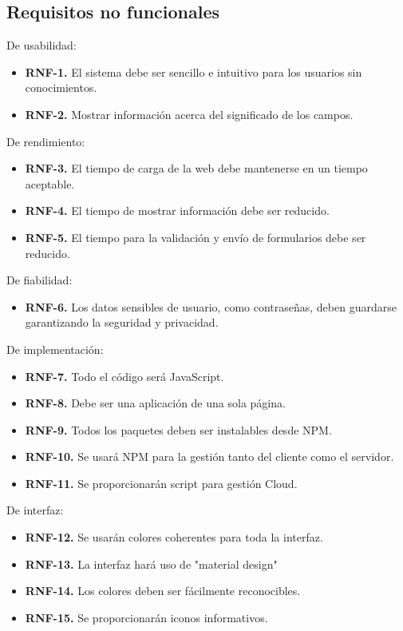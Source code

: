 \subsection{Requisitos no funcionales}

  De usabilidad:
\begin{itemize}
  \item \textbf{RNF-1.} El sistema debe ser sencillo e intuitivo para los usuarios sin conocimientos. 
  \item \textbf{RNF-2.} Mostrar información acerca del significado de los campos.
\end{itemize}
 De rendimiento:
\begin{itemize}
  \item \textbf{RNF-3.} El tiempo de carga de la web debe mantenerse en un tiempo aceptable.
  \item \textbf{RNF-4.} El tiempo de mostrar información debe ser reducido.
  \item \textbf{RNF-5.} El tiempo para la validación y envío de formularios debe ser reducido.
\end{itemize}
 De fiabilidad:
\begin{itemize}
  \item \textbf{RNF-6.} Los datos sensibles de usuario, como contraseñas, deben guardarse garantizando la seguridad y privacidad.
\end{itemize}
 De implementación: 
\begin{itemize}
  \item \textbf{RNF-7.} Todo el código será JavaScript.
  \item \textbf{RNF-8.} Debe ser una aplicación de una sola página.
  \item \textbf{RNF-9.} Todos los paquetes deben ser instalables desde \gls{NPM}.
  \item \textbf{RNF-10.} Se usará NPM para la gestión tanto del cliente como el servidor.
  \item \textbf{RNF-11.} Se proporcionarán script para gestión Cloud.
\end{itemize}
De interfaz:
\begin{itemize}
  \item \textbf{RNF-12.} Se usarán colores coherentes para toda la interfaz.
  \item \textbf{RNF-13.} La interfaz hará uso de "\gls{material design}"
  \item \textbf{RNF-14.} Los colores deben ser fácilmente reconocibles.
  \item \textbf{RNF-15.} Se proporcionarán iconos informativos.
\end{itemize}

